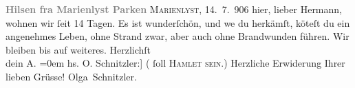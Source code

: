 \begin{ledgroupsized}[t]{13cm}
           \noindent{}\centering{}\textcolor{gray}{\textbf{{\pb}Hilsen fra Marienlyst Parken}}\pend
           \pstart
           \textsc{{\pb}Marienlyst}, 14. 7. 906\pend
           \pstart
           hier, lieber Hermann, wohnen wir ſeit 14 Tagen. Es ist wunderſchön,
               und we{\geminationn} du herkämſt, kö{\geminationn}teſt du ein angenehmes Leben, ohne Strand zwar, aber auch ohne Brandwunden führen.
               Wir bleiben bis auf weiteres.\pend
           \pstart
           Herzlichſt{\\[\baselineskip]}dein \spacefill\mbox{A.}\pend
           \leftskip=0em{}\pstart
           \noindent{}{\pb}{[}hs. O. Schnitzler:{]} (\label{T_L01612_1v}\label{T_L01612_1h} ſoll \textsc{Hamlet sein.})\pend
           \pstart Herzliche Erwiderung Ihrer lieben Grüsse!
               { }\spacefill\mbox{Olga Schnitzler.}\pend{}\endnumbering{}\end{ledgroupsized}  \newcommand{\dateiname}{L01612}\newcommand{\titel}{Arthur und Olga Schnitzler an Hermann Bahr, 14. 7. 1906}\newcommand{\editorInnen}{ Kurt Ifkovits,  Martin Anton Müller}
      